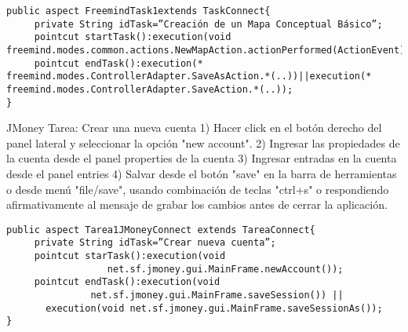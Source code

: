 \begin{verbatim}
public aspect FreemindTask1extends TaskConnect{
     private String idTask=”Creación de un Mapa Conceptual Básico”;
     pointcut startTask():execution(void freemind.modes.common.actions.NewMapAction.actionPerformed(ActionEvent));
     pointcut endTask():execution(* freemind.modes.ControllerAdapter.SaveAsAction.*(..))||execution(* freemind.modes.ControllerAdapter.SaveAction.*(..));
}

\end{verbatim}


JMoney
Tarea: Crear una nueva cuenta
1) Hacer click en el botón derecho del panel lateral y seleccionar la opción "new account".
2) Ingresar las propiedades de la cuenta desde el panel properties de la cuenta
3) Ingresar entradas en la cuenta desde el panel entries  
4) Salvar desde el botón "save" en la barra de herramientas o desde menú "file/save", usando combinación de teclas "ctrl+s" o respondiendo afirmativamente al mensaje de grabar los cambios antes de cerrar la aplicación.

\begin{verbatim}
public aspect Tarea1JMoneyConnect extends TareaConnect{		
     private String idTask=”Crear nueva cuenta”;
     pointcut starTask():execution(void   
                  net.sf.jmoney.gui.MainFrame.newAccount());
     pointcut endTask():execution(void                  
               net.sf.jmoney.gui.MainFrame.saveSession()) || 
       execution(void net.sf.jmoney.gui.MainFrame.saveSessionAs());
}

\end{verbatim}

